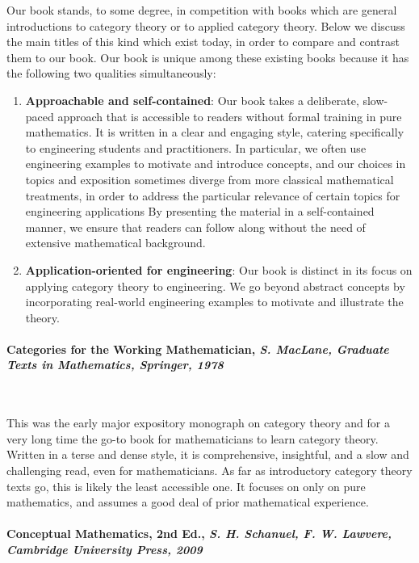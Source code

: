 \documentclass[10pt, article, one side]{memoir}
\begin{document}
    Our book stands, to some degree, in competition with books which are general introductions to category theory or to applied category theory.
    Below we discuss the main titles of this kind which exist today, in order to compare and contrast them to our book.
    Our book is unique among these existing books because it has the following two qualities simultaneously:
    \begin{enumerate}
        \item \textbf{Approachable and self-contained}: Our book takes a deliberate, slow-paced approach that is accessible to readers without formal training in pure mathematics.
              It is written in a clear and engaging style, catering specifically to engineering students and practitioners.
              In particular, we often use engineering examples to motivate and introduce concepts, and our choices in topics and exposition sometimes diverge from more classical mathematical treatments, in order to address the particular relevance of certain topics for engineering applications
              By presenting the material in a self-contained manner, we ensure that readers can follow along without the need of extensive mathematical background.

        \item \textbf{Application-oriented for engineering}: Our book is distinct in its focus on applying category theory to engineering.
              We go beyond abstract concepts by incorporating real-world engineering examples to motivate and illustrate the theory.
    \end{enumerate}

    \paragraph{Categories for the Working Mathematician, \emph{S.
            MacLane, Graduate Texts in Mathematics, Springer, 1978}~\cite{mac2013categories}}
    \

    This was the early major expository monograph on category theory and for a very long time the go-to book for mathematicians to learn category theory.
    Written in a terse and dense style, it is comprehensive, insightful, and a slow and challenging read, even for mathematicians.
    As far as introductory category theory texts go, this is likely the least accessible one.
    It focuses on only on pure mathematics, and assumes a good deal of prior mathematical experience.

    \paragraph{Conceptual Mathematics, 2nd Ed., \emph{S.
            H.
            Schanuel, F.
            W.
            Lawvere, Cambridge University Press, 2009}~\cite{lawvere2009conceptual}}
    \
\end{document}
